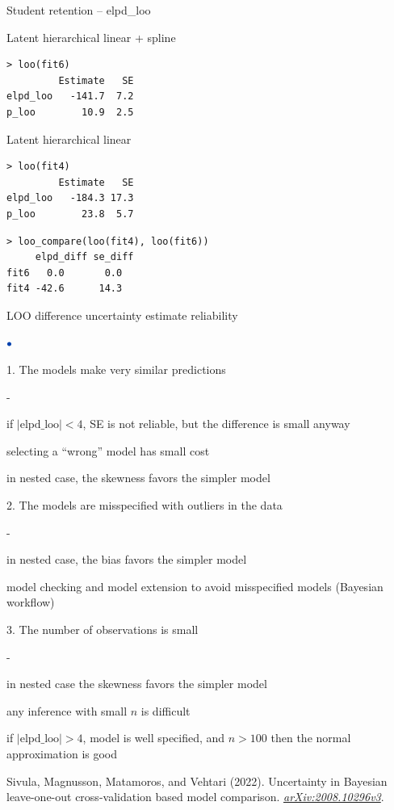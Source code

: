 \documentclass[english,t]{beamer}
\newenvironment{list1}{
   \begin{list}{$\color{list1}\bullet$}{\itemsep=6pt}}{
  \end{list}}
\newenvironment{list2}{
  \begin{list}{-}{\baselineskip=12pt\itemsep=2pt}}{
  \end{list}}
\begin{document}
\begin{frame}[fragile]{Student retention -- elpd\_loo}

  {\color{gray}
Latent hierarchical linear + spline
{\small
\begin{lstlisting}
> loo(fit6)
         Estimate   SE
elpd_loo   -141.7  7.2
p_loo        10.9  2.5
\end{lstlisting}}

Latent hierarchical linear
{\small
\begin{lstlisting}
> loo(fit4)
         Estimate   SE
elpd_loo   -184.3 17.3
p_loo        23.8  5.7
\end{lstlisting}}
}

{\small
\begin{lstlisting}
> loo_compare(loo(fit4), loo(fit6))
     elpd_diff se_diff
fit6   0.0       0.0  
fit4 -42.6      14.3  
\end{lstlisting}}

\end{frame}

\begin{frame}{LOO difference uncertainty estimate reliability}
\vspace{-0.2\baselineskip}

  \begin{list1}
  \item[1.] The models make very similar predictions
    \begin{list2}
    \item<2-> if $|\mathrm{elpd\_loo}|<4$, SE is not reliable, but the
      difference is small anyway
    \item<2-> selecting a ``wrong'' model has small cost
    \item<2-> in nested case, the skewness favors the simpler model
    \end{list2}
  \item[2.] The models are misspecified with outliers in the data
    \begin{list2}
    \item<3-> in nested case, the bias favors the simpler model
    \item<3-> model checking and model extension to avoid misspecified
      models (Bayesian workflow)
    \end{list2}
  \item[3.] The number of observations is small
    \begin{list2}
    \item<4-> in nested case the skewness favors the simpler model
    \item<4-> any inference with small $n$ is difficult
    \item<4-> if $|\mathrm{elpd\_loo}|>4$, model is well specified,
      and $n>100$ then the normal approximation is good
    \end{list2}
  \end{list1}

{\color{gray}\footnotesize  Sivula, Magnusson, Matamoros, and Vehtari (2022). Uncertainty in Bayesian leave-one-out cross-validation based model comparison. \textit{\href{https://arxiv.org/abs/2008.10296v3}{arXiv:2008.10296v3}}.}
  
\end{frame}
\end{document}
